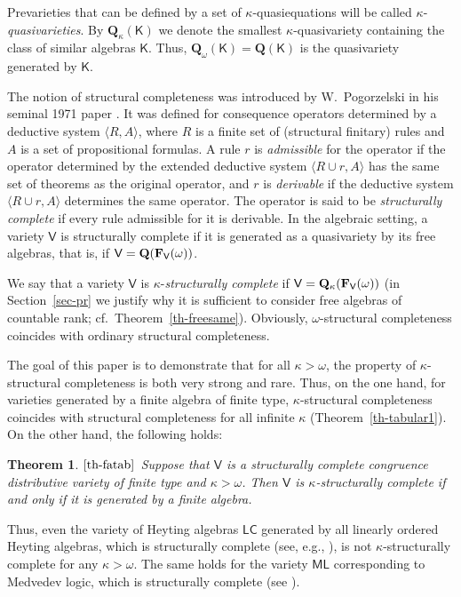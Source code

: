 \documentclass[submission,copyright,creativecommons]{eptcs}
\newtheorem*{mytheorem}{Theorem}
\theoremstyle{definition}
\newcommand{\alg}[1]{{{\textbf{\upshape #1}}}}
\newcommand{\QQ}{\mathbf{Q}}
\newcommand{\vv}[1]{\mathsf {#1}}
\newcommand{\FrV}{\alg F_\vv V(\omega)}
\newcommand{\Def}[1]{\textit{#1}}
\newcommand{\kk}{\kappa}
\begin{document}
Prevarieties that can be defined by a set of $\kk$-quasiequations will be called $\kk$-\Def{quasivarieties}. By $\QQ_\kk(\vv K)$ we denote the smallest $\kk$-quasivariety containing the class of similar algebras $\vv K$. Thus, $\QQ_\omega(\vv K) = \QQ(\vv K)$ is the quasivariety generated by $\vv K$.
\smallskip

The notion of structural completeness was introduced by W.~Pogorzelski in his seminal 1971 paper \cite{PogorzelskiStructural1971}. It was defined for consequence operators determined by a deductive system $\langle R, A \rangle$, where $R$ is a finite set of (structural finitary) rules and $A$ is a set of propositional formulas. A rule $r$ is \Def{admissible} for the operator if the operator determined by the extended deductive system $\langle R \cup {r}, A \rangle$ has the same set of theorems as the original operator, and $r$ is \Def{derivable} if the deductive system $\langle R \cup {r}, A \rangle$ determines the same operator. The operator is said to be \Def{structurally complete} if every rule admissible for it is derivable. In the algebraic setting, a variety $\vv V$ is structurally complete if it is generated as a quasivariety by its free algebras, that is, if $\vv V = \QQ(\FrV)$.

We say that a variety $\vv V$ is $\kk$-\Def{structurally complete} if $\vv V = \QQ_\kk(\FrV)$ (in Section~\ref{sec-pr} we justify why it is sufficient to consider free algebras of countable rank; cf.\ Theorem~\ref{th-freesame}). Obviously, $\omega$-structural completeness coincides with ordinary structural completeness.
\smallskip

The goal of this paper is to demonstrate that for all $\kk > \omega$, the property of $\kk$-structural completeness is both very strong and rare. Thus, on the one hand, for varieties generated by a finite algebra of finite type, $\kappa$-structural completeness coincides with structural completeness for all infinite $\kappa$ (Theorem~\ref{th-tabular1}). On the other hand, the following holds:

\begin{mytheorem} $\mathbf{\ref{th-fatab}}$\
	Suppose that $\vv V$ is a structurally complete congruence distributive variety of finite type and $\kappa > \omega$. Then $\vv V$ is $\kappa$-structurally complete if and only if it is generated by a finite algebra.
\end{mytheorem}

Thus, even the variety of Heyting algebras $\vv{LC}$ generated by all linearly ordered Heyting algebras, which is structurally complete (see, e.g., \cite{DzikWronski1973}), is not $\kappa$-structurally complete for any $\kappa > \omega$. The same holds for the variety $\vv{ML}$ corresponding to Medvedev logic, which is structurally complete (see \cite{PrucnalTwo1979}).
\end{document}
